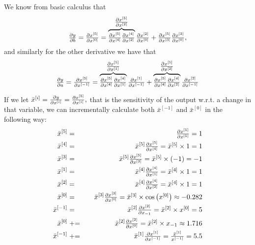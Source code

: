 \documentclass{sapthesis}
\begin{document}
We know from basic calculus that \[
    \partialfrac y b = \partialfrac{x^{[5]}}{x^{[0]}}
    = \overbrace{
        \partialfrac{x^{[5]}}{x^{[4]}} \partialfrac{x^{[4]}}{x^{[2]}}
    }^{\partialfrac{x^{[5]}}{x^{[2]}}} \partialfrac{x^{[2]}}{x^{[0]}}
    + \partialfrac{x^{[5]}}{x^{[3]}} \partialfrac{x^{[3]}}{x^{[0]}},
\] and similarly for the other derivative we have that \[
    \partialfrac y a = \partialfrac{x^{[5]}}{x^{[-1]}}
    = \overbrace{
        \partialfrac{x^{[5]}}{x^{[4]}} \partialfrac{x^{[4]}}{x^{[1]}}
    }^{\partialfrac{x^{[5]}}{x^{[1]}}} \partialfrac{x^{[1]}}{x^{[-1]}}
    + \overbrace{\partialfrac{x^{[5]}}{x^{[4]}} \partialfrac{x^{[4]}}{x^{[2]}}
    }^{\partialfrac{x^{[5]}}{x^{[2]}}} \partialfrac{x^{[2]}}{x^{[-1]}}
\]

If we let \(\bar x^{[i]} = \partialfrac y {x^{[i]}} =
\partialfrac{x^{[5]}}{x^{[i]}},\) that is the sensitivity of the output w.r.t. a
change in that variable, we can incrementally calculate both \(\bar x^{[-1]}\)
and \(\bar x^{[0]}\) in the following way:
\begingroup
\renewcommand{\partialfrac}[2]{\textstyle\frac{\partial#1}{\partial#2}}
\begin{eqnarray*}
    \bar x^{[5]}    &=& \partialfrac{x^{[5]}}{x^{[5]}}
        = 1 \\
    \bar x^{[4]}    &=& \bar x^{[5]}\partialfrac{x^{[5]}}{x^{[4]}}
        = \bar x^{[5]} \times 1 = 1 \\
    \bar x^{[3]}    &=& \bar x^{[5]}\partialfrac{x^{[5]}}{x^{[3]}}
        = \bar x^{[5]} \times (-1) = -1 \\
    \bar x^{[1]}    &=& \bar x^{[4]}\partialfrac{x^{[4]}}{x^{[1]}}
        = \bar x^{[4]} \times 1 = 1 \\
    \bar x^{[2]}    &=& \bar x^{[4]}\partialfrac{x^{[4]}}{x^{[2]}}
        = \bar x^{[4]} \times 1 = 1 \\
    \bar x^{[0]}    &=& \bar x^{[3]}\partialfrac{x^{[3]}}{x^{[0]}}
        = \bar x^{[3]} \times \cos\left(x^{[0]}\right) \approx -0.282 \\
    \bar x^{[-1]} &=& \bar x^{[2]}\partialfrac{x^{[2]}}{x_{-1}}
        = \bar x^{[2]} \times x^{[0]} = 5 \\
    \bar x^{[0]}    &\pluseq\phantom+& \bar x^{[2]}\partialfrac{x^{[2]}}{x^{[0]}}
        = \bar x^{[2]} \times x_{-1} \approx 1.716 \\
    \bar x^{[-1]} &\pluseq\phantom+& \bar x^{[1]}\partialfrac{x^{[1]}}{x^{[-1]}}
        = \frac{\bar x^{[1]}}{x^{[-1]}} = 5.5 \\
\end{eqnarray*}
\endgroup
\end{document}
